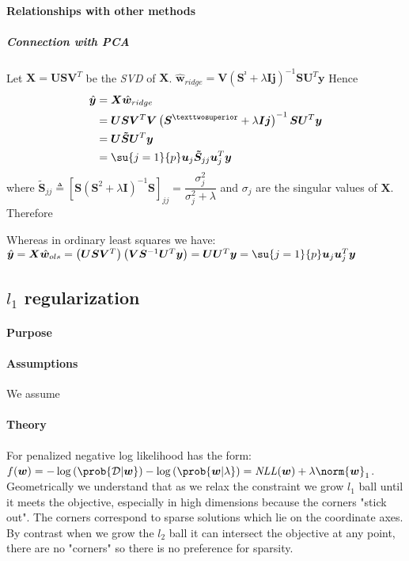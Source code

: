 \paragraph{Relationships with other methods}
\subparagraph{Connection with PCA}
Let $\bm{X} = \bm{USV}^{T}$ be the \emph{SVD} of $\bm{X}$.
$\hat{\bm{w}}_{ridge} = \bm{V}\left(\bm{S}^{²} +\lambda\bm{Ij}\right)^{-1}\bm{SU}^{T}\bm{y}$
Hence 
\begin{align*}
    \hat{\bm{y}} &= \bm{X}\hat{\bm{w}}_{ridge}\\
                 &= \bm{USV}^{T}\bm{V}\left(\bm{S}^{²} +\lambda\bm{Ij}\right)^{-1}\bm{SU}^{T}\bm{y}\\
                 &= \bm{U\tilde{S}U}^{T}\bm{y}\\
                 &= \su{j=1}{p}\bm{u}_{j}\bm{\tilde{S}}_{jj}\bm{u}_{j}^{T}\bm{y}
\end{align*}
where $\bm{\tilde{S}}_{jj}
\triangleq \left[\bm{S}\left(\bm{S}^{2} + \lambda\bm{I}\right)^{-1}\bm{S}\right]_{jj} = 
\dfrac{\sigma_{j}^{2}}{\sigma_{j}^{2} + \lambda}$ and $\sigma_{j}$ are the singular values of 
$\bm{X}$.
Therefore 
\begin{center}
\end{center}
Whereas in ordinary least squares we have:
$\hat{\bm{y}} = \bm{X}\hat{\bm{w}}_{ols} = \left(\bm{USV}^{T}\right)\left(\bm{VS}^{-1}\bm{U}^{T}
\bm{y}\right) = \bm{UU}^{T}\bm{y}=\su{j=1}{p}\bm{u}_{j}\bm{u}_{j}^{T}\bm{y}$


\subsection{$l_{1}$ regularization}
\paragraph{Purpose}

\paragraph{Assumptions}
We assume 
\paragraph{Theory}
For penalized negative log likelihood has the form: $f(\bm{w}) = -\log\left(\prob{
\mathcal{D}|\bm{w}}\right) - \log\left(\prob{\bm{w}|\lambda}\right) = \text{\emph{NLL}}
(\bm{w}) + \lambda\norm{\bm{w}}_{1}$.\\
Geometrically we understand that as we relax the constraint we grow $l_{1}$ ball until
it meets the objective,  especially in high dimensions because the corners "stick
out". The corners correspond to sparse solutions which lie on the coordinate axes. By
contrast when we grow the $l_{2}$ ball it can intersect the objective at any point, 
there are no "corners" so there is no preference for sparsity. 
